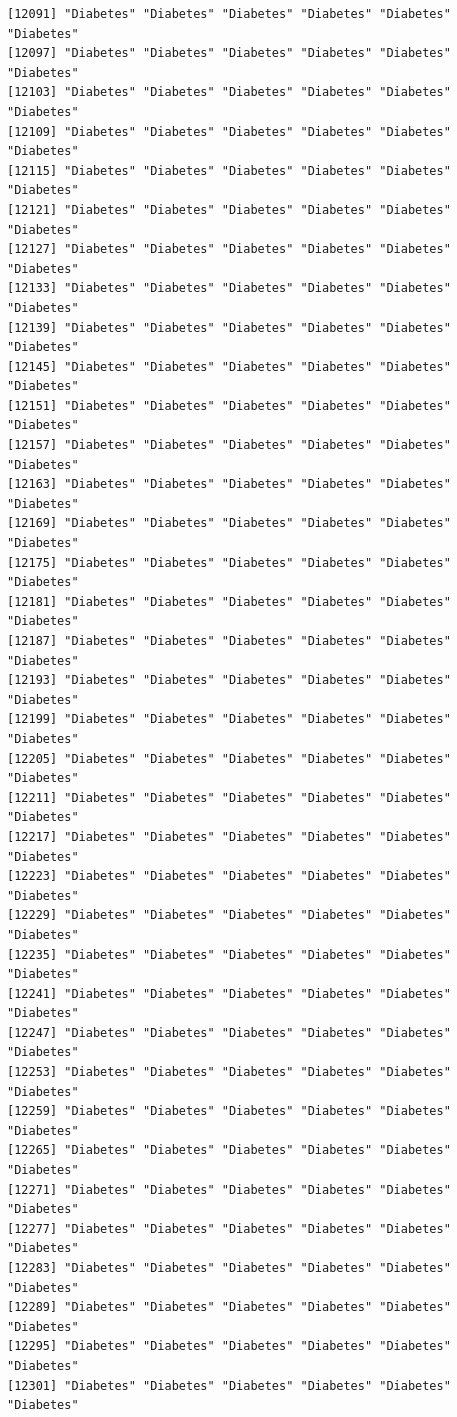 \documentclass[
  letterpaper,
  DIV=11,
  numbers=noendperiod]{scrartcl}
\begin{document}
\begin{verbatim}
[12091] "Diabetes" "Diabetes" "Diabetes" "Diabetes" "Diabetes" "Diabetes"
[12097] "Diabetes" "Diabetes" "Diabetes" "Diabetes" "Diabetes" "Diabetes"
[12103] "Diabetes" "Diabetes" "Diabetes" "Diabetes" "Diabetes" "Diabetes"
[12109] "Diabetes" "Diabetes" "Diabetes" "Diabetes" "Diabetes" "Diabetes"
[12115] "Diabetes" "Diabetes" "Diabetes" "Diabetes" "Diabetes" "Diabetes"
[12121] "Diabetes" "Diabetes" "Diabetes" "Diabetes" "Diabetes" "Diabetes"
[12127] "Diabetes" "Diabetes" "Diabetes" "Diabetes" "Diabetes" "Diabetes"
[12133] "Diabetes" "Diabetes" "Diabetes" "Diabetes" "Diabetes" "Diabetes"
[12139] "Diabetes" "Diabetes" "Diabetes" "Diabetes" "Diabetes" "Diabetes"
[12145] "Diabetes" "Diabetes" "Diabetes" "Diabetes" "Diabetes" "Diabetes"
[12151] "Diabetes" "Diabetes" "Diabetes" "Diabetes" "Diabetes" "Diabetes"
[12157] "Diabetes" "Diabetes" "Diabetes" "Diabetes" "Diabetes" "Diabetes"
[12163] "Diabetes" "Diabetes" "Diabetes" "Diabetes" "Diabetes" "Diabetes"
[12169] "Diabetes" "Diabetes" "Diabetes" "Diabetes" "Diabetes" "Diabetes"
[12175] "Diabetes" "Diabetes" "Diabetes" "Diabetes" "Diabetes" "Diabetes"
[12181] "Diabetes" "Diabetes" "Diabetes" "Diabetes" "Diabetes" "Diabetes"
[12187] "Diabetes" "Diabetes" "Diabetes" "Diabetes" "Diabetes" "Diabetes"
[12193] "Diabetes" "Diabetes" "Diabetes" "Diabetes" "Diabetes" "Diabetes"
[12199] "Diabetes" "Diabetes" "Diabetes" "Diabetes" "Diabetes" "Diabetes"
[12205] "Diabetes" "Diabetes" "Diabetes" "Diabetes" "Diabetes" "Diabetes"
[12211] "Diabetes" "Diabetes" "Diabetes" "Diabetes" "Diabetes" "Diabetes"
[12217] "Diabetes" "Diabetes" "Diabetes" "Diabetes" "Diabetes" "Diabetes"
[12223] "Diabetes" "Diabetes" "Diabetes" "Diabetes" "Diabetes" "Diabetes"
[12229] "Diabetes" "Diabetes" "Diabetes" "Diabetes" "Diabetes" "Diabetes"
[12235] "Diabetes" "Diabetes" "Diabetes" "Diabetes" "Diabetes" "Diabetes"
[12241] "Diabetes" "Diabetes" "Diabetes" "Diabetes" "Diabetes" "Diabetes"
[12247] "Diabetes" "Diabetes" "Diabetes" "Diabetes" "Diabetes" "Diabetes"
[12253] "Diabetes" "Diabetes" "Diabetes" "Diabetes" "Diabetes" "Diabetes"
[12259] "Diabetes" "Diabetes" "Diabetes" "Diabetes" "Diabetes" "Diabetes"
[12265] "Diabetes" "Diabetes" "Diabetes" "Diabetes" "Diabetes" "Diabetes"
[12271] "Diabetes" "Diabetes" "Diabetes" "Diabetes" "Diabetes" "Diabetes"
[12277] "Diabetes" "Diabetes" "Diabetes" "Diabetes" "Diabetes" "Diabetes"
[12283] "Diabetes" "Diabetes" "Diabetes" "Diabetes" "Diabetes" "Diabetes"
[12289] "Diabetes" "Diabetes" "Diabetes" "Diabetes" "Diabetes" "Diabetes"
[12295] "Diabetes" "Diabetes" "Diabetes" "Diabetes" "Diabetes" "Diabetes"
[12301] "Diabetes" "Diabetes" "Diabetes" "Diabetes" "Diabetes" "Diabetes"

\end{verbatim}
\end{document}
